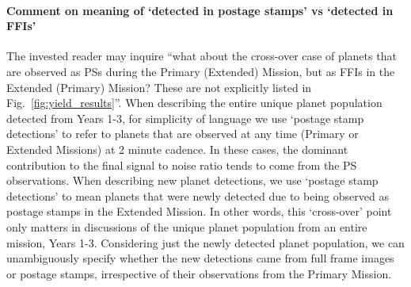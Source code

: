 \paragraph{Comment on meaning of `detected in postage stamps' vs `detected in FFIs'}
The invested reader may inquire ``what about the cross-over case of planets that are observed as PSs during the Primary (Extended) Mission, but as FFIs in the Extended (Primary) Mission? These are not explicitly listed in Fig.~\ref{fig:yield_results}''.
When describing the entire unique planet population detected from Years 1-3, for simplicity of language we use `postage stamp detections' to refer to planets that are observed at any time (Primary or Extended Missions) at 2 minute cadence.
In these cases, the dominant contribution to the final signal to noise ratio tends to come from the PS observations.
When describing new planet detections, we use `postage stamp detections' to mean planets that were newly detected due to being observed as postage stamps in the Extended Mission.
In other words, this `cross-over' point only matters in discussions of the unique planet population from an entire mission, Years 1-3.
Considering just the newly detected planet population, we can unambiguously specify whether the new detections came from full frame images or postage stamps, irrespective of their observations from the Primary Mission.
